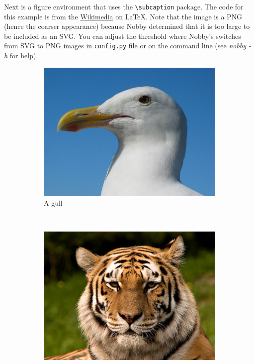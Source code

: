 \documentclass[10pt]{article}
\begin{document}
Next is a figure environment that uses the \texttt{\textbackslash{subcaption}}
package. The code for this example is from the
\href{http://en.wikibooks.org/wiki/LaTeX/Floats,_Figures_and_Captions}{Wikimedia}
on \LaTeX. Note that the image is a PNG (hence the coarser appearance)
because Nobby determined that it is too large to be included as an SVG. You can
adjust the threshold where Nobby's switches from SVG to PNG images in
\texttt{config.py} file or on the command line (see \emph{nobby -h} for help).\\
\begin{figure}
  \centering
  \begin{subfigure}[b]{0.3\textwidth}
    \includegraphics[width=\textwidth]{gull}
    \caption{A gull}
    \label{fig:gull}
  \end{subfigure}%
  ~ %
  \begin{subfigure}[b]{0.3\textwidth}
    \includegraphics[width=\textwidth]{tiger}

\end{subfigure}
\end{figure}
\end{document}
